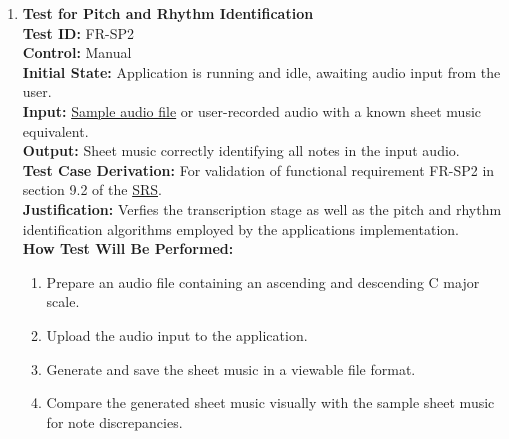 \documentclass[12pt, titlepage]{article}
\begin{document}
\begin{enumerate}
    \item \textbf{Test for Pitch and Rhythm Identification} \\
      \newline
      \textbf{Test ID:} FR-SP2 \\
      \textbf{Control:} Manual \\
      \textbf{Initial State:} Application is running and idle, awaiting audio input from the user. \\
      \textbf{Input:} \href{https://github.com/emilyperica/ScoreGen/blob/main/test/TestingDatasets/piano-samples/sample-scales/c-major-scale-on-treble-clef.wav}{Sample audio file} or user-recorded audio with a known sheet music equivalent. \\
      \textbf{Output:} Sheet music correctly identifying all notes in the input audio. \\
      \textbf{Test Case Derivation:} For validation of functional requirement FR-SP2 in section 9.2 of the 
      \href{https://github.com/emilyperica/ScoreGen/blob/main/docs/SRS-Volere/SRS.pdf}{SRS}. \\
      \textbf{Justification:} Verfies the transcription stage as well as the pitch and rhythm identification algorithms employed
      by the applications implementation.\\
      \textbf{How Test Will Be Performed:}
      \begin{enumerate}
          \item Prepare an audio file containing an ascending and descending C major scale.
          \item Upload the audio input to the application.
          \item Generate and save the sheet music in a viewable file format.
          \item Compare the generated sheet music visually with the sample sheet music for note discrepancies.
      \end{enumerate}


\end{enumerate}
\end{document}
